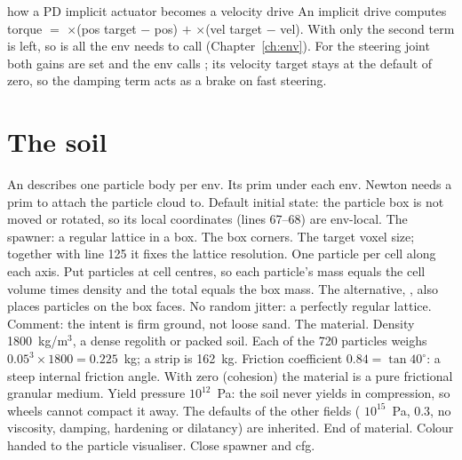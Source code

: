 \begin{isaacbox}{how a PD implicit actuator becomes a velocity drive}
An implicit drive computes torque $=$
$\times$(pos target $-$ pos) $+$ $\times$(vel
target $-$ vel). With  only the second term is left, so
 is all the env needs to call
(Chapter~\ref{ch:env}). For the steering joint both gains are set and the
env calls ; its velocity target stays at the
default of zero, so the damping term acts as a brake on fast steering.
\end{isaacbox}

\section{The soil}


\begin{explain}
 An  describes one particle body per env.
 Its prim under each env. Newton needs a prim to attach the particle
  cloud to.
 Default initial state: the particle box is not moved or rotated, so
  its local coordinates (lines 67--68) are env-local.
 The spawner: a regular lattice in a box.
 The box corners.
 The target voxel size; together with line 125 it fixes the lattice
  resolution.
 One particle per cell along each axis.
 Put particles at cell centres, so each particle's mass equals the
  cell volume times density and the total equals the box mass. The
  alternative, , also places particles on the box faces.
 No random jitter: a perfectly regular lattice.
 Comment: the intent is firm ground, not loose sand.
 The material.
 Density 1800~kg/m$^3$, a dense regolith or packed soil. Each of the
  720 particles weighs $0.05^3 \times 1800 = 0.225$~kg; a strip is 162~kg.
 Friction coefficient $0.84 = \tan 40^\circ$: a steep internal
  friction angle. With zero  (cohesion) the material is
  a pure frictional granular medium.
 Yield pressure $10^{12}$~Pa: the soil never yields in compression,
  so wheels cannot compact it away. The defaults of the other fields
  ( $10^{15}$~Pa,  0.3, no
  viscosity, damping, hardening or dilatancy) are inherited.
 End of material.
 Colour handed to the particle visualiser.
 Close spawner and cfg.
\end{explain}

